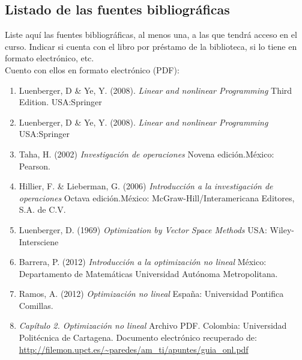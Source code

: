 \documentclass[12pt, letterpaper]{article}
\begin{document}
\subsection{Listado de las fuentes bibliogr\'aficas}
Liste aquí las fuentes bibliográficas, al menos una, a las que tendrá acceso en el curso. Indicar si cuenta con el libro por préstamo de la biblioteca, si lo tiene en formato electrónico, etc.\\
Cuento con ellos en formato electr\'onico (PDF): 
\begin{enumerate} 
\item Luenberger, D \&  Ye, Y. (2008). \textit{Linear and nonlinear Programming} Third Edition. USA:Springer 
\item Luenberger, D \&  Ye, Y. (2008). \textit{Linear and nonlinear Programming}  USA:Springer 
\item Taha, H. (2002)  \textit{Investigaci\'on de operaciones} Novena edici\'on.M\'exico: Pearson.
\item Hillier, F. \& Lieberman, G. (2006)  \textit{Introducci\'on a la investigaci\'on de operaciones} Octava edici\'on.M\'exico: McGraw-Hill/Interamericana Editores, S.A. de C.V. 
\item Luenberger, D. (1969)  \textit{Optimization by Vector Space Methods} USA: Wiley-Intersciene 
\item Barrera, P. (2012)  \textit{Introducci\'on a la optimización no lineal } M\'exico: Departamento de Matem\'aticas Universidad Aut\'onoma Metropolitana.
\item Ramos, A. (2012)  \textit{Optimizaci\'on no lineal } España: Universidad Pontifica Comillas.
\item \textit{Capítulo 2. Optimización no lineal} Archivo PDF. Colombia: Universidad Politécnica de Cartagena. Documento electrónico recuperado de:  \url{http://filemon.upct.es/~paredes/am_ti/apuntes/guia_onl.pdf}

\end{enumerate}
\clearpage
	


\end{document}
